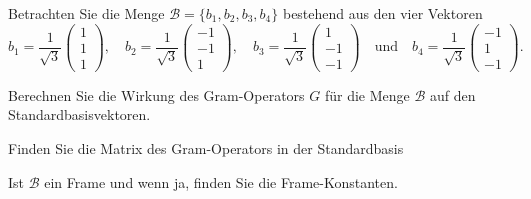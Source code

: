 Betrachten Sie die Menge $\mathcal{B}=\{b_1,b_2,b_3,b_4\}$ bestehend aus 
den vier Vektoren
\[
b_1
=
\frac{1}{\sqrt{3}}
\begin{pmatrix}
1\\1\\1
\end{pmatrix},\quad
b_2
=
\frac{1}{\sqrt{3}}
\begin{pmatrix}
-1\\-1\\1
\end{pmatrix},\quad
b_3
=
\frac{1}{\sqrt{3}}
\begin{pmatrix}
1\\-1\\-1
\end{pmatrix}
\quad\text{und}\quad
b_4
=
\frac{1}{\sqrt{3}}
\begin{pmatrix}
-1\\1\\-1
\end{pmatrix}.
\]
\begin{teilaufgaben}
\item
Berechnen Sie die Wirkung des Gram-Operators $G$ für die Menge $\mathcal{B}$
auf den Standardbasisvektoren.
\item
Finden Sie die Matrix des Gram-Operators in der Standardbasis
\item
Ist $\mathcal{B}$ ein Frame und wenn ja, finden Sie die Frame-Konstanten.
\end{teilaufgaben}

